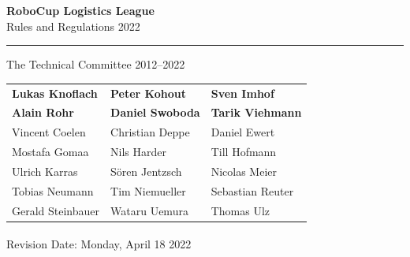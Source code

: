 \documentclass[12pt,twoside]{article}
\begin{document}
\hypersetup{pageanchor=false}


\begin{titlepage}
  \vspace*{5cm}
  \begin{center}
    \begin{LARGE}

      {\bf RoboCup Logistics League}\\[2ex]
      {\Large Rules and Regulations 2022}\\[4ex]
    \end{LARGE}
    \hrule

    {\LARGE\vspace*{4ex}}
    \begin{Large}
      The Technical Committee 2012--2022\\[6ex]
    \end{Large}
    \begin{tabular}{lll}
      \textbf{Lukas Knoflach}&
      \textbf{Peter Kohout}&
      \textbf{Sven Imhof}\\
      \textbf{Alain Rohr}&
      \textbf{Daniel Swoboda}&
      \textbf{Tarik Viehmann}\\[.5em]
      Vincent Coelen
      &Christian Deppe
      &Daniel Ewert
      \\
      Mostafa Gomaa
      &Nils Harder
      &Till Hofmann
      \\
      Ulrich Karras
      &S\"oren Jentzsch
      &Nicolas Meier
      \\
      Tobias Neumann
      &Tim Niemueller
      &Sebastian Reuter
      \\
      Gerald Steinbauer
      &Wataru Uemura
      &Thomas Ulz
      \\
    \end{tabular}
    \vfill
    Revision Date: Monday, April 18\textsuperscript{}
    2022
  \end{center}
\end{titlepage}
\thispagestyle{empty}
\pagebreak
\clearpage

\hypersetup{pageanchor=true}
\setcounter{page}{1}
\tableofcontents
\newpage
\cleardoublepage{}

\setcounter{page}{1}
\end{document}
